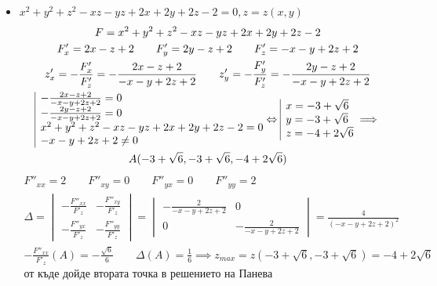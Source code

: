\documentclass[a4paper,fleqn,12pt]{article}
\theoremstyle{definition}
\begin{document}
\begin{itemize}
\item $x^2 + y^2 + z^2 - xz -yz + 2x + 2y + 2z - 2 = 0, z = z(x,y)$
\begin{gather*}
F = x^2 + y^2 + z^2 - xz -yz + 2x + 2y + 2z - 2\\
F'_x = 2x - z + 2 \qquad F'_y = 2y - z + 2 \qquad F'_z = -x -y + 2z + 2 \\
z'_x = - \frac{F'_x}{F'_z} = - \frac{2x - z + 2}{-x -y + 2z + 2}\qquad z'_y = -\frac{F'_y}{F'_z} = -\frac{2y - z + 2}{-x -y + 2z + 2}\\
\begin{array}{|l@{}}
- \frac{2x - z + 2}{-x -y + 2z + 2} = 0 \\
-\frac{2y - z + 2}{-x -y + 2z + 2} = 0 \\
x^2 + y^2 + z^2 - xz -yz + 2x + 2y + 2z - 2 = 0\\
 -x -y + 2z + 2 \neq 0
\end{array}\Leftrightarrow 
\begin{array}{|l@{}}
x = -3 + \sqrt{6} \\
y = -3 + \sqrt{6} \\
z = -4 + 2\sqrt{6}
\end{array} \implies \\
A( -3 + \sqrt{6},-3 + \sqrt{6}, -4 + 2\sqrt{6})
\end{gather*}
\begin{gather*}
F''_{xx} =  2 \qquad F''_{xy} =  0 \qquad F''_{yx} = 0 \qquad F''_{yy} = 2 \\
\Delta = \begin{vmatrix} -\frac{F''_{xx}}{F'_z} &  -\frac{F''_{xy}}{F'_z} \\  -\frac{F''_{yx}}{F'_z} &  -\frac{F''_{yy}}{F'_z} \end{vmatrix} = \begin{vmatrix} -\frac{2}{ -x -y + 2z + 2 } & 0 \\  0 &  -\frac{2}{ -x -y + 2z + 2 } \end{vmatrix} = \frac{4}{( -x -y + 2z + 2 )^2} \\
-\frac{F''_{xx}}{F'_z} (A) = -\frac{\sqrt{6}}{6} \qquad \Delta(A) = \frac{1}{6} \implies z_{max} = z( -3 + \sqrt{6},-3 + \sqrt{6}) =  -4 + 2\sqrt{6}\\
\text{от къде дойде втората точка в решението на Панева}
\end{gather*}


\end{itemize}
\end{document}
